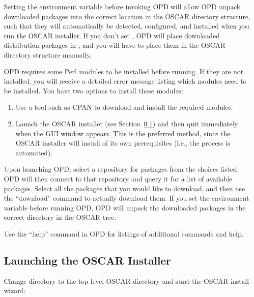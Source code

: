 Setting the  environment variable before invoking
OPD will allow OPD unpack downloaded packages into the correct
location in the OSCAR directory structure, such that they will
automatically be detected, configured, and installed when you run the
OSCAR installer.  If you don't set , OPD will place
downloaded distribution packages in , and
you will have to place them in the OSCAR directory structure manually.

OPD requires some Perl modules to be installed before running.  If
they are not installed, you will receive a detailed error message
listing which modules need to be installed.  You have two options to
install these modules:

\begin{enumerate}
\item Use a tool such as CPAN to download and install the required
  modules.
  
\item Launch the OSCAR installer (see
  Section~\ref{det:installcluster}) and then quit immediately when the
  GUI window appears.  This is the preferred method, since the OSCAR
  installer will install of its own prerequisites (i.e., the process is
  automated).
\end{enumerate}

Upon launching OPD, select a repository for packages from the choices
listed.  OPD will then connect to that repository and query it for a
list of available packages.  Select all the packages that you would
like to download, and then use the ``download'' command to actually
download them.  If you set the  environment
variable before running OPD, OPD will unpack the downloaded packages
in the correct directory in the OSCAR tree.

Use the ``help'' command in OPD for listings of additional commands
and help.

  
\subsection{Launching the OSCAR Installer}
\label{det:installcluster}

Change directory to the top-level OSCAR directory and start the OSCAR
install wizard:

